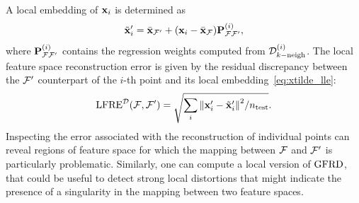 A local embedding of $\mathbf{x}_i$ is determined as
\begin{equation}
\tilde{\mathbf{x}}^{\prime}_i = \bar{\mathbf{x}}_{\mathcal{F}^{\prime}} + (\mathbf{x}_i - \bar{\mathbf{x}}_{\mathcal{F}})\mathbf{P}_{{\mathcal{F}}{\mathcal{F}^{\prime}}}^{(i)},\label{eq:xtilde_lle}
\end{equation}
where $\mathbf{P}_{{\mathcal{F}}{\mathcal{F}^{\prime}}}^{(i)}$ contains the regression weights computed from $\mathcal{D}_{k-\text{neigh}}^{(i)}$.
The local feature space reconstruction error is given by the residual discrepancy between the $\mathcal{F}^{\prime}$ counterpart of the $i$-th point and its local embedding~\eqref{eq:xtilde_lle}:
\begin{equation}
\operatorname{LFRE}^{\mathcal{D}}(\mathcal{F},\mathcal{F}^{\prime}) = \sqrt{\sum_i \norm{\mathbf{x}^{\prime}_i - \tilde{\mathbf{x}}^{\prime}_i}^2/{n_{\mathrm{test}}}}.
\label{eq:LFRE}
\end{equation}
Inspecting the error associated with the reconstruction of individual points can reveal regions of feature space for which the mapping between $\mathcal{F}$  and $\mathcal{F}^{\prime}$ is particularly problematic. 
Similarly, one can compute a local version of $\operatorname{GFRD}$, that could be useful to detect strong local distortions that might indicate the presence of a singularity in the mapping between two feature spaces.



